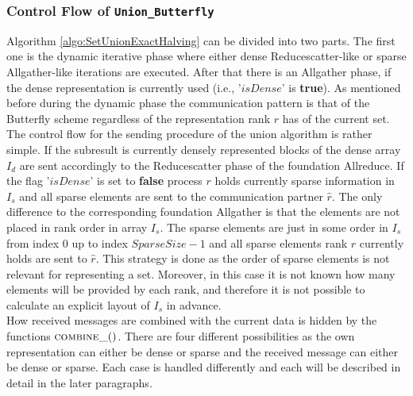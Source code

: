 \subsubsection{Control Flow of \texttt{Union\_Butterfly}}
Algorithm \ref{algo:SetUnionExactHalving} can be divided into two parts. The first one is the dynamic iterative phase where either dense Reducescatter-like or sparse Allgather-like iterations are executed. After that there is an Allgather phase, if the dense representation is currently used (i.e., '$isDense$' is \textbf{true}). As mentioned before during the dynamic phase the communication pattern is that of the Butterfly scheme regardless of the representation rank $r$ has of the current set.\\
The control flow for the sending procedure of the union algorithm is rather simple. If the  subresult is currently densely represented blocks of the dense array $I_d$ are sent accordingly to the Reducescatter phase of the foundation Allreduce. If the flag '$isDense$' is set to \textbf{false} process $r$ holds currently sparse information in $I_s$ and all sparse elements are sent to the communication partner $\hat{r}$. The only difference to the corresponding foundation Allgather is that the elements are not placed in rank order in array $I_s$. The sparse elements are just in some order in $I_s$ from index $0$ up to index $SparseSize-1$ and all sparse elements rank $r$ currently holds are sent to $\hat{r}$. This strategy is done as the order of sparse elements is not relevant for representing a set. Moreover, in this case it is not known how many elements will be provided by each rank, and therefore it is not possible to calculate an explicit layout of $I_s$ in advance.\\
How received messages are combined with the current data is hidden by the functions $\Call{combine\_}$. There are four different possibilities as the own representation can either be dense or sparse and the received message can either be dense or sparse. Each case is handled differently and each will be described in detail in the later paragraphs. 


